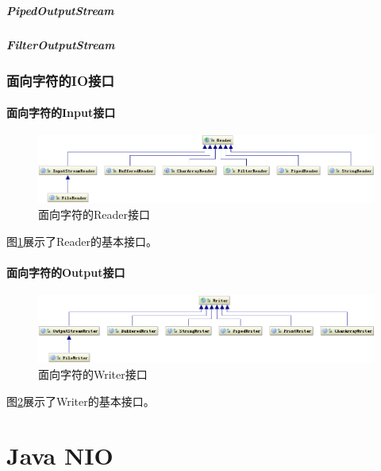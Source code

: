 \documentclass[a4paper,11pt]{article}
\begin{document}
\subsubsection[PipedOutputStream]{PipedOutputStream}
\subsubsection[FilterOutputStream]{FilterOutputStream}


\section[面向字符的IO接口]{面向字符的IO接口}
\subsection[面向字符的Input接口]{面向字符的Input接口}
\begin{figure}
  \centering
  \includegraphics[width=.9\textwidth]{picturedir/reader.png}
  \caption{面向字符的Reader接口}
  \label{fig:reader}
\end{figure}

图\ref{fig:reader}展示了Reader的基本接口。

\subsection[面向字符的Output接口]{面向字符的Output接口}
\begin{figure}
  \centering
  \includegraphics[width=.9\textwidth]{picturedir/writer.png}
  \caption{面向字符的Writer接口}
  \label{fig:writer}
\end{figure}

图\ref{fig:writer}展示了Writer的基本接口。


\part[Java NIO]{Java NIO}
\end{document}
